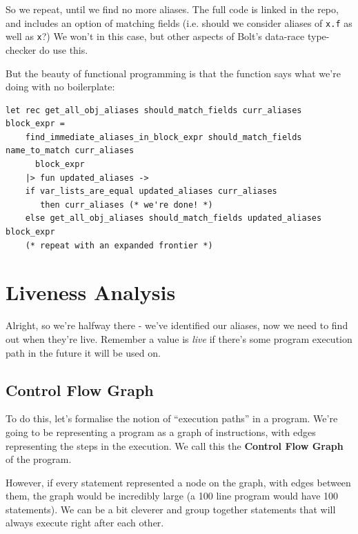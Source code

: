 So we repeat, until we find no more aliases. The full code is linked in
the repo, and includes an option of matching fields (i.e. should we
consider aliases of \texttt{x.f} as well as \texttt{x}?) We won't in
this case, but other aspects of Bolt's data-race type-checker do use
this.

But the beauty of functional programming is that the function says what
we're doing with no boilerplate:

%

\begin{lstlisting}[language=caml]
let rec get_all_obj_aliases should_match_fields curr_aliases block_expr =
    find_immediate_aliases_in_block_expr should_match_fields name_to_match curr_aliases
      block_expr
    |> fun updated_aliases ->
    if var_lists_are_equal updated_aliases curr_aliases
       then curr_aliases (* we're done! *)
    else get_all_obj_aliases should_match_fields updated_aliases block_expr
    (* repeat with an expanded frontier *)
\end{lstlisting}

\hypertarget{liveness-analysis}{%
\section{\texorpdfstring{\protect\hyperlink{liveness-analysis}{}Liveness
Analysis}{Liveness Analysis}}\label{liveness-analysis}}

Alright, so we're halfway there - we've identified our aliases, now we
need to find out when they're live. Remember a value is \emph{live} if
there's some program execution path in the future it will be used on.

\hypertarget{control-flow-graph}{%
\subsection{\texorpdfstring{\protect\hyperlink{control-flow-graph}{}Control
Flow Graph}{Control Flow Graph}}\label{control-flow-graph}}

To do this, let's formalise the notion of ``execution paths'' in a
program. We're going to be representing a program as a graph of
instructions, with edges representing the steps in the execution. We
call this the \textbf{Control Flow Graph} of the program.

However, if every statement represented a node on the graph, with edges
between them, the graph would be incredibly large (a 100 line program
would have 100 statements). We can be a bit cleverer and group together
statements that will always execute right after each other.

